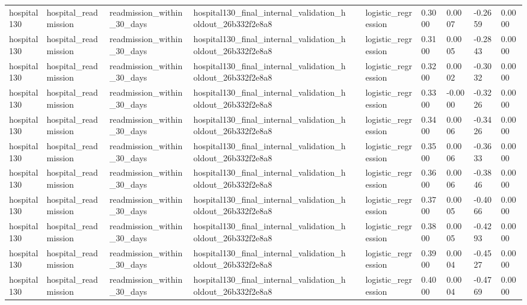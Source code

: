 \begin{tabular}{llllllllll}
hospital130 & hospital\_readmission & readmission\_within\_30\_days & hospital130\_final\_internal\_validation\_holdout\_26b332f2e8a8 &  & logistic\_regression & 0.3000 & 0.0007 & -0.2659 & 0.0000 \\
hospital130 & hospital\_readmission & readmission\_within\_30\_days & hospital130\_final\_internal\_validation\_holdout\_26b332f2e8a8 &  & logistic\_regression & 0.3100 & 0.0005 & -0.2843 & 0.0000 \\
hospital130 & hospital\_readmission & readmission\_within\_30\_days & hospital130\_final\_internal\_validation\_holdout\_26b332f2e8a8 &  & logistic\_regression & 0.3200 & 0.0002 & -0.3032 & 0.0000 \\
hospital130 & hospital\_readmission & readmission\_within\_30\_days & hospital130\_final\_internal\_validation\_holdout\_26b332f2e8a8 &  & logistic\_regression & 0.3300 & -0.0000 & -0.3226 & 0.0000 \\
hospital130 & hospital\_readmission & readmission\_within\_30\_days & hospital130\_final\_internal\_validation\_holdout\_26b332f2e8a8 &  & logistic\_regression & 0.3400 & 0.0006 & -0.3426 & 0.0000 \\
hospital130 & hospital\_readmission & readmission\_within\_30\_days & hospital130\_final\_internal\_validation\_holdout\_26b332f2e8a8 &  & logistic\_regression & 0.3500 & 0.0006 & -0.3633 & 0.0000 \\
hospital130 & hospital\_readmission & readmission\_within\_30\_days & hospital130\_final\_internal\_validation\_holdout\_26b332f2e8a8 &  & logistic\_regression & 0.3600 & 0.0006 & -0.3846 & 0.0000 \\
hospital130 & hospital\_readmission & readmission\_within\_30\_days & hospital130\_final\_internal\_validation\_holdout\_26b332f2e8a8 &  & logistic\_regression & 0.3700 & 0.0005 & -0.4066 & 0.0000 \\
hospital130 & hospital\_readmission & readmission\_within\_30\_days & hospital130\_final\_internal\_validation\_holdout\_26b332f2e8a8 &  & logistic\_regression & 0.3800 & 0.0005 & -0.4293 & 0.0000 \\
hospital130 & hospital\_readmission & readmission\_within\_30\_days & hospital130\_final\_internal\_validation\_holdout\_26b332f2e8a8 &  & logistic\_regression & 0.3900 & 0.0004 & -0.4527 & 0.0000 \\
hospital130 & hospital\_readmission & readmission\_within\_30\_days & hospital130\_final\_internal\_validation\_holdout\_26b332f2e8a8 &  & logistic\_regression & 0.4000 & 0.0004 & -0.4769 & 0.0000 \\

\end{tabular}
